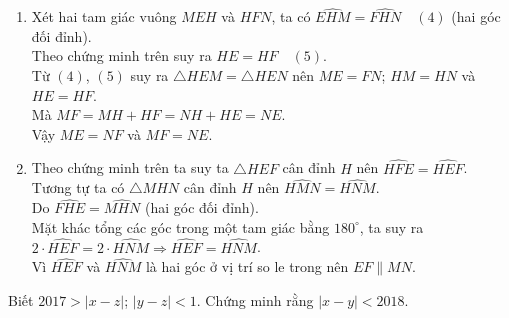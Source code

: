 \begin{ex}
{\begin{enumerate}
{
				}
				\item Xét hai tam giác vuông $MEH$ và $HFN$, ta có $\widehat{EHM} = \widehat{FHN}\quad (4)$ (hai góc đối đỉnh).\\
				 Theo chứng minh trên suy ra $HE = HF\quad (5)$.\\
				 Từ $(4)$, $(5)$ suy ra $\triangle HEM = \triangle HEN$ nên $ME = FN$; $HM = HN$ và $HE = HF$.\\
				 Mà $MF = MH + HF = NH + HE = NE$.\\
				 Vậy $ME = NF$ và $MF = NE$.
				 \item  Theo chứng minh trên ta suy ta $\triangle HEF$ cân đỉnh $H$ nên $\widehat{HFE} = \widehat{HEF}$.\\
				 Tương tự ta có $\triangle MHN$ cân đỉnh $H$ nên $\widehat{HMN} = \widehat{HNM}$.\\
				 Do $\widehat{FHE} = \widehat{MHN}$ (hai góc đối đỉnh).\\
				 Mặt khác tổng các góc trong một tam giác bằng $180^{\circ}$, ta suy ra\\
				  $2\cdot \widehat{HEF} =  2\cdot \widehat{HNM}\Rightarrow \widehat{HEF} =  \widehat{HNM}$.\\
				   Vì $\widehat{HEF}$ và $\widehat{HNM}$ là hai góc ở vị trí so le trong nên $EF\parallel MN$. 
				\end{enumerate}
			}
		\end{ex}
			\begin{ex}%
             Biết $2017 > \left\vert x - z \right\vert$; $\left\vert y - z \right\vert < 1$.  Chứng minh rằng $\left\vert x - y \right\vert < 2018$. 
			\end{ex}


